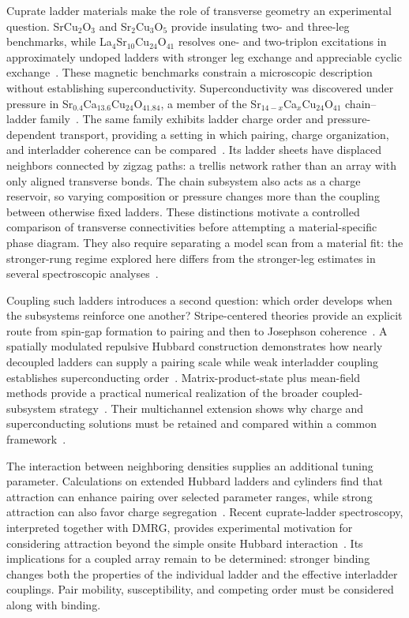\documentclass[11pt,letterpaper]{article}
\begin{document}
Cuprate ladder materials make the role of transverse geometry an experimental
question. SrCu$_2$O$_3$ and Sr$_2$Cu$_3$O$_5$ provide insulating two- and
three-leg benchmarks, while La$_4$Sr$_{10}$Cu$_{24}$O$_{41}$ resolves
one- and two-triplon excitations in approximately undoped ladders with
stronger leg exchange and appreciable cyclic exchange~\citep{Azuma1994,Notbohm2007}.
These magnetic benchmarks constrain a microscopic description without
establishing superconductivity. Superconductivity was discovered under pressure in
Sr$_{0.4}$Ca$_{13.6}$Cu$_{24}$O$_{41.84}$, a member of the
Sr$_{14-x}$Ca$_x$Cu$_{24}$O$_{41}$ chain--ladder family~\citep{Uehara1996}.
The same family exhibits ladder charge order and pressure-dependent transport,
providing a setting in which pairing, charge organization, and interladder
coherence can be compared~\citep{Nagata1998,Abbamonte2004,Rusydi2006}.
Its ladder sheets have displaced neighbors connected by zigzag paths: a
trellis network rather than an array with only aligned transverse bonds.
The chain subsystem also acts as a charge reservoir, so varying composition
or pressure changes more than the coupling between otherwise fixed ladders.
These distinctions motivate a controlled comparison of transverse
connectivities before attempting a material-specific phase diagram.
They also require separating a model scan from a material fit: the
stronger-rung regime explored here differs from the stronger-leg estimates
in several spectroscopic analyses~\citep{Schmidt2005,Notbohm2007,Padma2025}.

Coupling such ladders introduces a second question: which order develops when
the subsystems reinforce one another? Stripe-centered theories provide an
explicit route from spin-gap formation to pairing and then to Josephson
coherence~\citep{Emery1997}. A spatially modulated repulsive Hubbard
construction demonstrates how nearly decoupled ladders can supply a pairing
scale while weak interladder coupling establishes superconducting
order~\citep{Arrigoni2004}. Matrix-product-state plus mean-field methods
provide a practical numerical realization of the broader coupled-subsystem
strategy~\citep{Bollmark2020,Bollmark2023}. Their multichannel extension shows
why charge and superconducting solutions must be retained and compared within
a common framework~\citep{Bollmark2025}.

The interaction between neighboring densities supplies an additional tuning
parameter. Calculations on extended Hubbard ladders and cylinders find that
attraction can enhance pairing over selected parameter ranges, while strong
attraction can also favor charge segregation~\citep{Zhou2023,Peng2023}.
Recent cuprate-ladder spectroscopy, interpreted together with DMRG, provides
experimental motivation for considering attraction beyond the simple onsite
Hubbard interaction~\citep{Padma2025}. Its implications for a coupled array
remain to be determined: stronger binding changes both the properties of the
individual ladder and the effective interladder couplings. Pair mobility,
susceptibility, and competing order must be considered along with binding.
\end{document}
